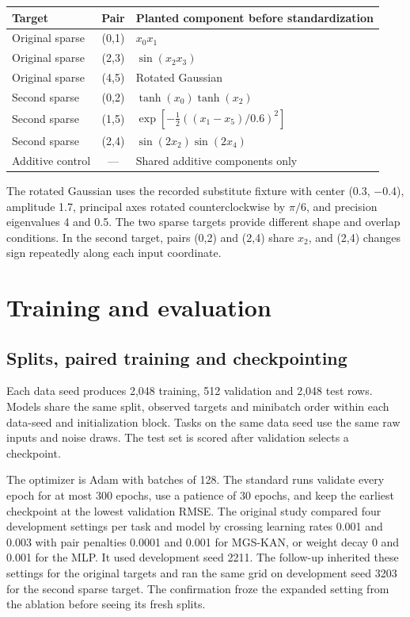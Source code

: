 \documentclass[11pt]{article}
\numberwithin{equation}{section}
\begin{document}
\begin{center}
\small
\begin{tabularx}{\linewidth}{@{} l c Y @{}}
\toprule
\textbf{Target} & \textbf{Pair} & \textbf{Planted component before standardization} \\
\midrule
Original sparse & (0,1) & \(x_0x_1\) \\
Original sparse & (2,3) & \(\sin(x_2x_3)\) \\
Original sparse & (4,5) & Rotated Gaussian \\
Second sparse & (0,2) & \(\tanh(x_0)\tanh(x_2)\) \\
Second sparse & (1,5) & \(\exp[-\tfrac12((x_1-x_5)/0.6)^2]\) \\
Second sparse & (2,4) & \(\sin(2x_2)\sin(2x_4)\) \\
Additive control & --- & Shared additive components only \\
\bottomrule
\end{tabularx}
\end{center}

The rotated Gaussian uses the recorded substitute fixture with center (0.3,
\ensuremath{-}0.4), amplitude 1.7, principal axes rotated counterclockwise by \(\pi/6\), and
precision eigenvalues 4 and 0.5. The two sparse targets provide different shape and overlap
conditions. In the second target, pairs (0,2) and (2,4) share \(x_2\), and (2,4) changes sign
repeatedly along each input coordinate.

\section{Training and evaluation}

\subsection{Splits, paired training and checkpointing}

Each data seed produces 2,048 training, 512 validation and 2,048 test rows. Models share the
same split, observed targets and minibatch order within each data-seed and initialization
block. Tasks on the same data seed use the same raw inputs and noise draws. The test set is
scored after validation selects a checkpoint.

The optimizer is Adam with batches of 128. The standard runs validate every epoch for at most
300 epochs, use a patience of 30 epochs, and keep the earliest checkpoint at the lowest
validation RMSE. The original study compared four development settings per task and model by
crossing learning rates 0.001 and 0.003 with pair penalties 0.0001 and 0.001 for MGS-KAN, or
weight decay 0 and 0.001 for the MLP. It used development seed 2211. The follow-up inherited
these settings for the original targets and ran the same grid on development seed 3203 for the
second sparse target. The confirmation froze the expanded setting from the ablation before
seeing its fresh splits.
\end{document}
